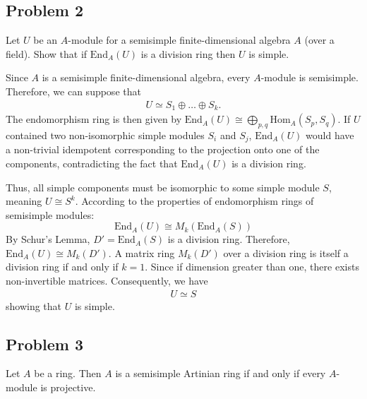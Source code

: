 \subsection*{Problem 2}

Let $U$ be an $A$-module for a semisimple finite-dimensional algebra $A$ (over a field). Show that if $\text{End}_A(U)$ is a division ring then $U$ is simple.

\begin{solution}
   Since $A$ is a semisimple finite-dimensional algebra, every $A$-module is semisimple.
   Therefore, we can suppose that 
   \begin{align*}
    U \simeq   S_1 \oplus \dots \oplus S_k.
   \end{align*}
The endomorphism ring is then given by $\text{End}_A(U) \cong \bigoplus_{p, q} \text{Hom}_A(S_p, S_q)$. If $U$ contained two non-isomorphic simple modules $S_i$ and $S_j$, $\text{End}_A(U)$ would have a non-trivial idempotent corresponding to the projection onto one of the components, contradicting the fact that $\text{End}_A(U)$ is a division ring.

Thus, all simple components must be isomorphic to some simple module $S$, meaning $U \cong S^k$. According to the properties of endomorphism rings of semisimple modules:
\[ \text{End}_A(U) \cong M_k(\text{End}_A(S)) \]
By Schur's Lemma, $D' = \text{End}_A(S)$ is a division ring. Therefore, $\text{End}_A(U) \cong M_k(D')$. A matrix ring $M_k(D')$ over a division ring is itself a division ring if and only if $k = 1$. 
Since if dimension greater than one, there exists non-invertible matrices. Consequently, we have 
\begin{align*}
    U\simeq S 
\end{align*} 
showing that $U$ is simple.
\end{solution}

\subsection*{Problem 3}

Let $A$ be a ring. Then $A$ is a semisimple Artinian ring if and only if every $A$-module is projective.


